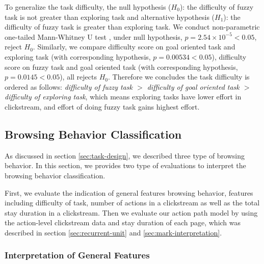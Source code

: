 To generalize the task difficulty, the null hypothesis ($H_0$): the difficulty of fuzzy task is not greater
than exploring task and alternative hypothesis ($H_1$): the difficulty of fuzzy task is greater than
exploring task. We conduct non-parametric one-tailed Mann-Whitney U test \cite{mann1947test}, 
under null hypothesis, $p=2.54\times 10^{-5} < 0.05$, reject $H_0$.
Similarly, we compare difficulty score on goal oriented task and exploring task (with corresponding hypothesis, 
$p=0.00534 < 0.05$), difficulty score on fuzzy task and goal oriented task (with corresponding hypothesis, 
$p=0.0145 < 0.05$), all rejects $H_0$. Therefore we concludes the task difficulty is ordered
as follows: \emph{difficulty of fuzzy task $>$ difficulty of goal oriented task $>$ difficulty of exploring task},
which means exploring tasks have lower effort in clickstream, and effort of doing fuzzy task gains highest effort.

\subsection{Browsing Behavior Classification}

As discussed in section \ref{sec:task-design}, we described three type of browsing behavior. 
In this section, we provides two type of evaluations to interpret the browsing behavior classification.

First, we evaluate the indication of general features browsing behavior,
features including difficulty of task, number of actions in a clickstream as well as the total stay duration in a clickstream.
Then we evaluate our action path model by using the action-level clickstream data and stay duration of each page,
which was described in section \ref{sec:recurrent-unit} and \ref{sec:mark-interpretation}.

\subsubsection{Interpretation of General Features}


